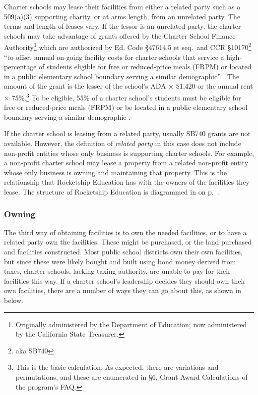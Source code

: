 Charter schools may lease their facilities from either a related party such as a 509(a)(3) supporting charity, or at arms length, from an unrelated party. The terms and length of leases vary. If the lessor is an unrelated party, the charter schools may take advantage of grants offered by the Charter School Finance Authority\footnote{Originally administered by the Department of Education; now administered by the California State Treasurer.} which are authorized by Ed. Code §47614.5 et seq. and CCR §10170\footnote{aka SB740} ``to offset annual on-going facility costs for charter schools that service a high-percentage of students eligible for free or reduced-price meals (FRPM) or located in a public elementary school boundary serving a similar demographic'' \parencite{CATreasurer2023}. The amount of the grant is the lesser of the school's ADA × \$1,420 or the annual rent × 75\%.\footnote{This is the basic calculation. As expected, there are variations and permutations, and these are enumerated in §6, Grant Award Calculations of the program's FAQ\@.} To be eligible, 55\% of a charter school's students must be eligible for free or reduced-price meals (FRPM) or be located in a public elementary school boundary serving a similar demographic \parencite[§1]{CATreasurer2023}.

If the charter school is leasing from a related party, usually SB740 grants are not available. However, the definition of \emph{related party} in this case does not include non-profit entities whose only business is supporting charter schools. For example, a non-profit charter school may lease a property from a related non-profit entity whose only business is owning and maintaining that property. This is the relationship that Rocketship Education has with the owners of the facilities they lease. The structure of Rocketship Education is diagrammed in  on p.~\pageref{fig:corporate-structure}.

\subsubsection{Owning}\label{sec:owning}\indent%

The third way of obtaining facilities is to own the needed facilities, or to have a related party own the facilities. These might be purchased, or the land purchased and facilities constructed. Most public school districts own their own facilities, but since these were likely bought and built using bond money derived from taxes, charter schools, lacking taxing authority, are unable to pay for their facilities this way.
If a charter school's leadership decides they should own their own facilities, there are a number of ways they can go about this, as shown in  below.

